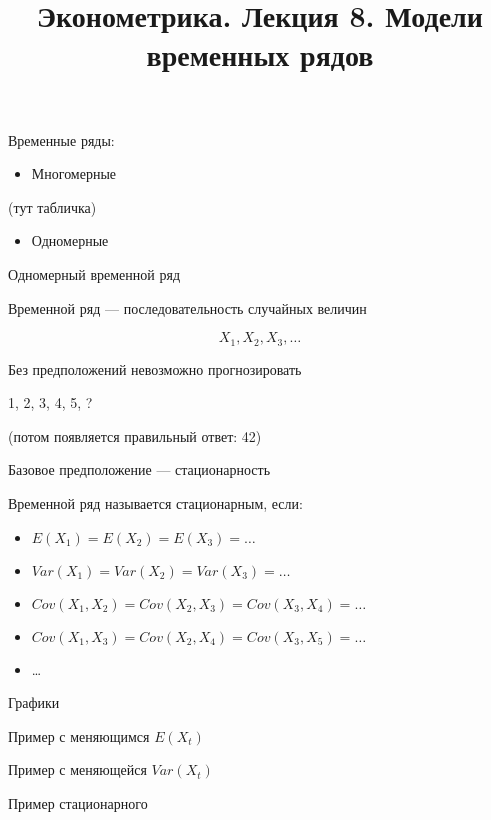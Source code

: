 \documentclass[ignorenonframetext,]{beamer}
\title{Эконометрика. Лекция 8. Модели временных рядов}
\begin{document}
\frame{\titlepage}

\begin{frame}{Временные ряды:}

\begin{itemize}
\itemsep1pt\parskip0pt
\item
  Многомерные
\end{itemize}

(тут табличка)

\begin{itemize}
\itemsep1pt\parskip0pt
\item
  Одномерные
\end{itemize}

\end{frame}

\begin{frame}{Одномерный временной ряд}

Временной ряд --- последовательность случайных величин

\[
X_1, X_2, X_3, \ldots
\]

\end{frame}

\begin{frame}{Без предположений невозможно прогнозировать}

1, 2, 3, 4, 5, ?

(потом появляется правильный ответ: 42)

\end{frame}

\begin{frame}{Базовое предположение --- стационарность}

Временной ряд называется стационарным, если:

\begin{itemize}
\itemsep1pt\parskip0pt
\item
  $E(X_1)=E(X_2)=E(X_3)=\ldots$
\item
  $Var(X_1)=Var(X_2)=Var(X_3)=\ldots$
\item
  $Cov(X_1,X_2)=Cov(X_2,X_3)=Cov(X_3,X_4)=\ldots$
\item
  $Cov(X_1,X_3)=Cov(X_2,X_4)=Cov(X_3,X_5)=\ldots$
\item
  \ldots
\end{itemize}

\end{frame}

\begin{frame}{Графики}

Пример с меняющимся $E(X_t)$

Пример с меняющейся $Var(X_t)$

Пример стационарного

\end{frame}
\end{document}
